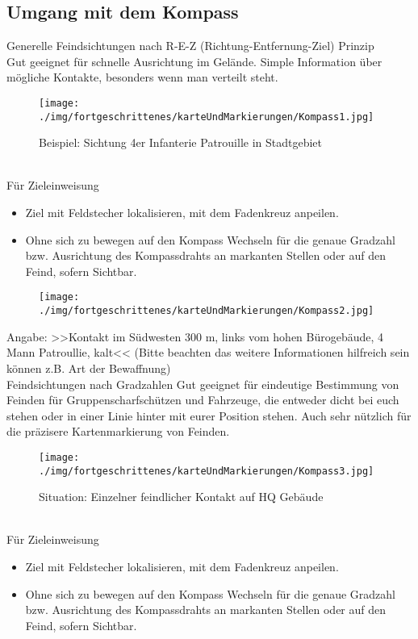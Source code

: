 \subsection{Umgang mit dem Kompass}
Generelle Feindsichtungen nach R-E-Z (Richtung-Entfernung-Ziel) Prinzip \\

Gut geeignet für schnelle Ausrichtung im Gelände. Simple Information über mögliche Kontakte, besonders wenn man verteilt steht.
\begin{figure}[!h]
	\centering
	\texttt{[image: ./img/fortgeschrittenes/karteUndMarkierungen/Kompass1.jpg]}
	\caption{Beispiel: Sichtung 4er Infanterie Patrouille in Stadtgebiet}
\end{figure}\\
	
Für Zieleinweisung
\begin{itemize}
	\item Ziel mit Feldstecher lokalisieren, mit dem Fadenkreuz anpeilen.
	\item Ohne sich zu bewegen auf den Kompass Wechseln für die genaue Gradzahl bzw. Ausrichtung des Kompassdrahts an markanten Stellen oder auf den Feind, sofern Sichtbar.
\end{itemize}

\begin{figure}[!h]
	\centering
	\texttt{[image: ./img/fortgeschrittenes/karteUndMarkierungen/Kompass2.jpg]}
\end{figure}

Angabe: >>Kontakt im Südwesten 300 m, links vom hohen Bürogebäude, 4 Mann Patroullie, kalt<< (Bitte beachten das weitere Informationen hilfreich sein können z.B. Art der Bewaffnung)\\

Feindsichtungen nach Gradzahlen
Gut geeignet für eindeutige Bestimmung von Feinden für Gruppenscharfschützen und Fahrzeuge, die entweder dicht bei euch stehen oder in einer Linie hinter mit eurer Position stehen. Auch sehr nützlich für die präzisere Kartenmarkierung von Feinden.
\begin{figure}[!h]
	\centering
	\texttt{[image: ./img/fortgeschrittenes/karteUndMarkierungen/Kompass3.jpg]}
	\caption{Situation: Einzelner feindlicher Kontakt auf HQ Gebäude}
\end{figure}\\

Für Zieleinweisung
\begin{itemize}
	\item Ziel mit Feldstecher lokalisieren, mit dem Fadenkreuz anpeilen.
	\item Ohne sich zu bewegen auf den Kompass Wechseln für die genaue Gradzahl bzw. Ausrichtung des Kompassdrahts an markanten Stellen oder auf den Feind, sofern Sichtbar.
\end{itemize}

